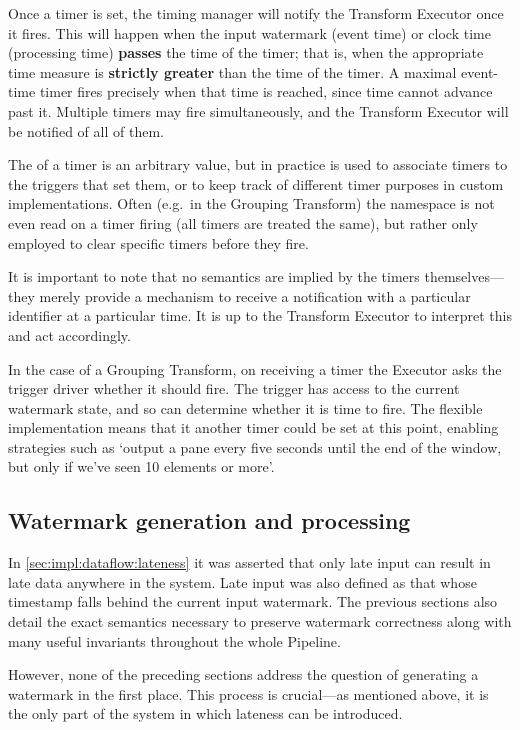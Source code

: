 Once a timer is set, the timing manager will notify the Transform Executor once it fires.
This will happen when the input watermark (event time) or clock time (processing time) \textbf{passes} the time of the timer; that is, when the appropriate time measure is \textbf{strictly greater} than the time of the timer.
A maximal event-time timer fires precisely when that time is reached, since time cannot advance past it.
Multiple timers may fire simultaneously, and the Transform Executor will be notified of all of them.

The  of a timer is an arbitrary value, but in practice is used to associate timers to the triggers that set them, or to keep track of different timer purposes in custom implementations.
Often (e.g.\ in the Grouping Transform) the namespace is not even read on a timer firing (all timers are treated the same), but rather only employed to clear specific timers before they fire.

It is important to note that no semantics are implied by the timers themselves---they merely provide a mechanism to receive a notification with a particular identifier at a particular time.
It is up to the Transform Executor to interpret this and act accordingly.

In the case of a Grouping Transform, on receiving a timer the Executor asks the trigger driver whether it should fire.
The trigger has access to the current watermark state, and so can determine whether it is time to fire.
The flexible implementation means that it another timer could be set at this point, enabling strategies such as `output a pane every five seconds until the end of the window, but only if we've seen 10 elements or more'.

\subsection{Watermark generation and processing}\label{sec:impl:dataflow:watermark-generation}


In \cref{sec:impl:dataflow:lateness} it was asserted that only late input can result in late data anywhere in the system.
Late input was also defined as that whose timestamp falls behind the current input watermark.
The previous sections also detail the exact semantics necessary to preserve watermark correctness along with many useful invariants throughout the whole Pipeline.

However, none of the preceding sections address the question of generating a watermark in the first place.
This process is crucial---as mentioned above, it is the only part of the system in which lateness can be introduced.

